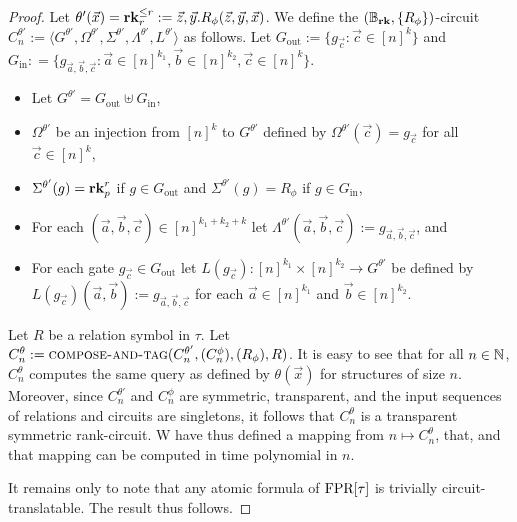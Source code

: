 \documentclass[../paper.tex]{subfiles}
\begin{document}
\begin{proof}
  Let $\theta'(\vec{x}) = \text{\textbf{rk}}^{\leq r}_r := \vec{z}, \vec{y}. R_{\phi}
  (\vec{z}, \vec{y}, \vec{x})$. We define the $(\mathbb{B}_{\text{\textbf{rk}}}, \{ R_{\phi}
  \})$-circuit $C^{\theta'}_n:= \langle G^{\theta'}, \Omega^{\theta'},
  \Sigma^{\theta'}, \Lambda^{\theta'}, L^{\theta'}\rangle$ as follows. Let
  $G_{\text{out}} := \{g_{\vec{c}} : \vec{c} \in [n]^k\}$ and $G_{\text{in}} : =
  \{ g_{\vec{a}, \vec{b}, \vec{c}} : \vec{a} \in [n]^{k_1}, \vec{b} \in
  [n]^{k_2}, \vec{c} \in [n]^{k}\}$.
  
  \begin{itemize}
    \setlength\itemsep{0mm}
  \item Let $G^{\theta'} = G_{\text{out}} \uplus G_{\text{in}}$,
  \item $\Omega^{\theta'}$ be an injection from $[n]^k$ to $G^{\theta'}$ defined
    by $\Omega^{\theta'}(\vec{c}) = g_{\vec{c}}$ for all $\vec{c} \in [n]^k$,
  \item $\Sigma^{\theta'} (g) = \text{\textbf{rk}}^r_p$ if $g \in G_{\text{out}}$ and
    $\Sigma^{\theta'}(g) = R_\phi$ if $g \in G_{\text{in}}$,
  \item For each $(\vec{a}, \vec{b}, \vec{c}) \in [n]^{k_1 +k_2 + k}$ let
    $\Lambda^{\theta'} (\vec{a}, \vec{b}, \vec{c}) := g_{\vec{a}, \vec{b},
      \vec{c}}$, and
  \item For each gate $g_{\vec{c}} \in G_{\text{out}}$ let $L(g_{\vec{c}}):
    [n]^{k_1} \times [n]^{k_2} \rightarrow G^{\theta'}$ be defined by
    $L(g_{\vec{c}})(\vec{a}, \vec{b}) := g_{\vec{a}, \vec{b}, \vec{c}}$ for each
    $\vec{a} \in [n]^{k_1}$ and $\vec{b} \in [n]^{k_2}$.
  \end{itemize}
 





  Let $R$ be a relation symbol in $\tau$. Let $C^{\theta}_n :=
  {\normalfont\textsc{compose-and-tag}}(C^{\theta'}_n, (C^{\phi}_n), (R_\phi), R)$. It is easy to
  see that for all $n \in \mathbb{N}$, $C^{\theta}_n$ computes the same query as
  defined by $\theta(\vec{x})$ for structures of size $n$. Moreover, since
  $C^{\theta'}_n$ and $C^{\phi}_n$ are symmetric, transparent, and the input
  sequences of relations and circuits are singletons, it follows that
  $C^{\theta}_n$ is a transparent symmetric rank-circuit. W have thus defined a
  mapping from $n \mapsto C^{\theta}_n$, that, and that mapping can be computed
  in time polynomial in $n$.
 
  It remains only to note that any atomic formula of $\text{\upshape FPR}[\tau]$ is trivially
  circuit-translatable. The result thus follows.
\end{proof}
\end{document}
